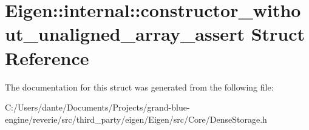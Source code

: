 \hypertarget{struct_eigen_1_1internal_1_1constructor__without__unaligned__array__assert}{}\section{Eigen\+::internal\+::constructor\+\_\+without\+\_\+unaligned\+\_\+array\+\_\+assert Struct Reference}
\label{struct_eigen_1_1internal_1_1constructor__without__unaligned__array__assert}


The documentation for this struct was generated from the following file\+:\begin{DoxyCompactItemize}
\item 
C\+:/\+Users/dante/\+Documents/\+Projects/grand-\/blue-\/engine/reverie/src/third\+\_\+party/eigen/\+Eigen/src/\+Core/Dense\+Storage.\+h\end{DoxyCompactItemize}
